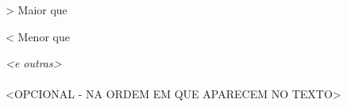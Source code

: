 \begin{simbolos}
\item[>] Maior que
\item[<] Menor que

\textit{<e outras>}
\\
\\
<OPCIONAL - NA ORDEM EM QUE APARECEM NO TEXTO>
\end{simbolos}